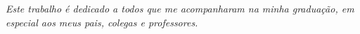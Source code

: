 \begin{dedicatoria}
   \vspace*{\fill}
   \centering
   \noindent
   \textit{ Este trabalho é dedicado a todos que me acompanharam na minha graduação, em especial aos meus pais, colegas e professores. \\ } \vspace*{\fill}
\end{dedicatoria}